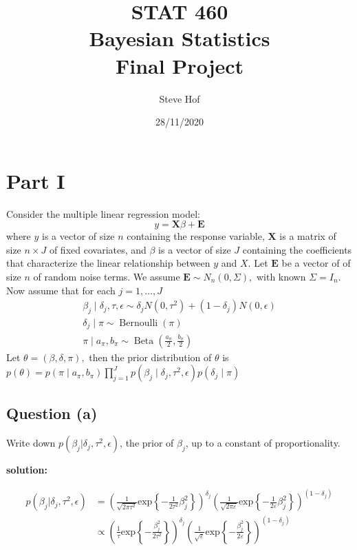 \documentclass[
]{article}
\title{STAT 460\\
Bayesian Statistics\\
Final Project}
\author{Steve Hof}
\date{28/11/2020}
\begin{document}
\maketitle

\hypertarget{part-i}{%
\section{Part I}\label{part-i}}

Consider the multiple linear regression model: \[
y=\boldsymbol{X} \beta+\boldsymbol{E}
\] where \(y\) is a vector of size \(n\) containing the response
variable, \(\boldsymbol{X}\) is a matrix of size \(n \times J\) of fixed
covariates, and \(\beta\) is a vector of size \(J\) containing the
coefficients that characterize the linear relationship between \(y\) and
\(X .\) Let \(\boldsymbol{E}\) be a vector of of size \(n\) of random
noise terms. We assume \(\boldsymbol{E} \sim N_{n}(0, \Sigma),\) with
known \(\Sigma=I_{n} .\) Now assume that for each \(j=1, \ldots, J\) \[
\begin{array}{c}
\beta_{j} \mid \delta_{j}, \tau, \epsilon \sim \delta_{j} N\left(0, \tau^{2}\right)+\left(1-\delta_{j}\right) N(0, \epsilon) \\
\delta_{j} \mid \pi \sim \operatorname{Bernoulli}(\pi) \\
\pi \mid a_{\pi}, b_{\pi} \sim \operatorname{Beta}\left(\frac{a_{\pi}}{2}, \frac{b_{\pi}}{2}\right)
\end{array}
\] Let \(\theta=(\beta, \delta, \pi),\) then the prior distribution of
\(\theta\) is
\(p(\theta)=p\left(\pi \mid a_{\pi}, b_{\pi}\right) \prod_{j=1}^{J} p\left(\beta_{j} \mid \delta_{j}, \tau^{2}, \epsilon\right) p\left(\delta_{j} \mid \pi\right)\)

\hypertarget{question-a}{%
\subsection{Question (a)}\label{question-a}}

Write down \(p(\beta_j | \delta_j, \tau^2, \epsilon)\), the prior of
\(\beta_j\), up to a constant of proportionality.

\textbf{solution:}

\begin{align*}
p(\beta_j | \delta_j, \tau^2, \epsilon) &= \left(\frac{1}{\sqrt{2\pi \tau^2}}\text{exp}\left\{-\frac{1}{2\tau^2} \beta_j^2 \right\} \right)^{\delta_j} \left(\frac{1}{\sqrt{2\pi\varepsilon}}\text{exp}\left\{-\frac{1}{2\varepsilon}\beta_j^2 \right\} \right)^{(1-\delta_j)} \\
  &\propto \left(\frac{1}{\tau}\text{exp}\left\{-\frac{\beta_j^2}{2\tau^2} \right\} \right)^{\delta_j} \left(\frac{1}{\sqrt{\varepsilon}} \text{exp}\left\{-\frac{\beta_j^2}{2\varepsilon} \right\} \right)^{(1-\delta_j)}
\end{align*}
\end{document}
